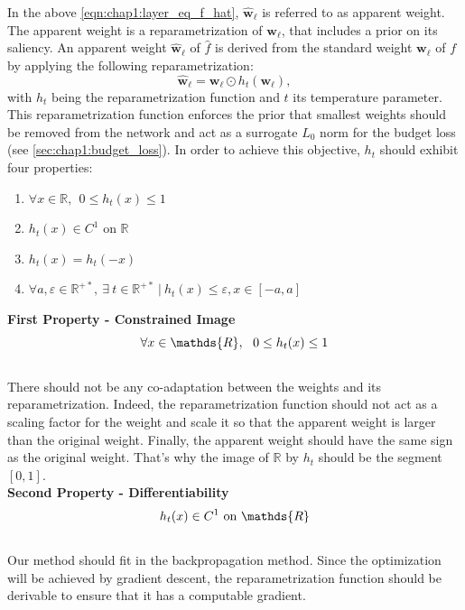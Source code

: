 \noindent In the above \cref{eqn:chap1:layer_eq_f_hat}, $\mathbf{\hat w}_\ell$
is referred to as apparent weight. The apparent weight is a reparametrization of
$\mathbf{w}_\ell$, that includes a prior on its saliency. An apparent weight
$\mathbf{\hat w}_\ell$ of $\hat{f}$ is derived from the standard weight
$\mathbf{w}_\ell$ of $f$ by applying the following reparametrization: 
\begin{equation}
  \label{eqn:reparam}
  \mathbf{\hat w}_\ell = \mathbf{w}_\ell  \odot h_t(\mathbf{w}_\ell),
\end{equation}
\noindent with $h_t$ being the reparametrization function and $t$ its
temperature parameter. This reparametrization function enforces the prior that
smallest weights should be removed from the network and act as a surrogate $L_0$
norm for the budget loss (see \cref{sec:chap1:budget_loss}). In order to achieve
this objective, $h_t$ should exhibit four properties: \\

\begin{enumerate}
  \item $\forall x \in \mathds{R},~~ 0 \leq h_t(x) \leq 1 $
  \item $h_t(x) \in C^1 \text{ on } \mathds{R}$
  \item $h_t(x) = h_t(-x)$
  \item $\forall a,\varepsilon \in\mathds{R}^{+\ast},~ \exists ~t
  \in\mathds{R}^{+\ast} ~ | ~ h_t(x) \leq \varepsilon, x \in [-a,a]$
\end{enumerate}

\noindent\textbf{First Property - Constrained Image} \\
\begin{equation}
    \centering
    \forall x \in \mathds{R},~~ 0 \leq h_t(x) \leq 1
    \label{eqn:chap1:reparam_prop1}
\end{equation}
\\
There should not be any co-adaptation between the weights and its
reparametrization. Indeed, the reparametrization function should not act as a
scaling factor for the weight and scale it so that the apparent weight is larger
than the original weight. Finally, the apparent weight should have the same sign
as the original weight. That's why the image of $\mathbb{R}$ by $h_t$ should be
the segment $[0,1]$.\\

\noindent\textbf{Second Property - Differentiability} \\
\begin{equation}
    \centering
    h_t(x) \in C^1 \text{ on } \mathds{R}
    \label{eqn:chap1:reparam_prop2}
\end{equation}
\\
Our method should fit in the backpropagation method. Since the optimization will
be achieved by gradient descent, the reparametrization function should be
derivable to ensure that it has a computable gradient.\\

